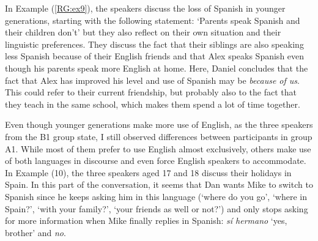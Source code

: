 \documentclass[output=paper]{langscibook}
\begin{document}
In Example (\ref{RG:ex9}), the speakers discuss the loss of Spanish in younger generations, starting with the following statement: ‘Parents speak Spanish and their children don’t’ but they also reflect on their own situation and their linguistic preferences. They discuss the fact that their siblings are also speaking less Spanish because of their English friends and that Alex speaks Spanish even though his parents speak more English at home. Here, Daniel concludes that the fact that Alex has improved his level and use of Spanish may be \textit{because of us}. This could refer to their current friendship, but probably also to the fact that they teach in the same school, which makes them spend a lot of time together.

Even though younger generations make more use of English, as the three speakers from the B1 group state, I still observed differences between participants in group A1. While most of them prefer to use English almost exclusively, others make use of both languages in discourse and even force English speakers to accommodate. In Example (10), the three speakers aged 17 and 18 discuss their holidays in Spain. In this part of the conversation, it seems that Dan wants Mike to switch to Spanish since he keeps asking him in this language (‘where do you go’, ‘where in Spain?’, ‘with your family?’, ‘your friends as well or not?’) and only stops asking for more information when Mike finally replies in Spanish: \textit{sí hermano} ‘yes, brother’ and \textit{no}.
\end{document}
